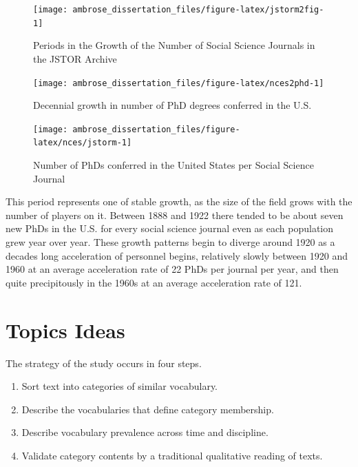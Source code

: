 \documentclass[]{book}
\providecommand{\tightlist}{%
  \setlength{\itemsep}{0pt}\setlength{\parskip}{0pt}}
\theoremstyle{definition}
\theoremstyle{definition}
\theoremstyle{definition}
\theoremstyle{remark}
\begin{document}
\begin{figure}

{\centering \texttt{[image: ambrose\_dissertation\_files/figure-latex/jstorm2fig-1]} 

}

\caption{Periods in the Growth of the Number of Social Science Journals in the JSTOR Archive}\label{fig:jstorm2fig}
\end{figure}

\begin{figure}

{\centering \texttt{[image: ambrose\_dissertation\_files/figure-latex/nces2phd-1]} 

}

\caption{Decennial growth in number of PhD degrees conferred in the U.S.}\label{fig:nces2phd}
\end{figure}

\begin{figure}

{\centering \texttt{[image: ambrose\_dissertation\_files/figure-latex/nces/jstorm-1]} 

}

\caption{Number of PhDs conferred in the United States per Social Science Journal}\label{fig:nces/jstorm}
\end{figure}

This period represents one of stable growth, as the size of the field
grows with the number of players on it. Between 1888 and 1922 there
tended to be about seven new PhDs in the U.S. for every social science
journal even as each population grew year over year. These growth
patterns begin to diverge around 1920 as a decades long acceleration of
personnel begins, relatively slowly between 1920 and 1960 at an average
acceleration rate of 22 PhDs per journal per year, and then quite
precipitously in the 1960s at an average acceleration rate of 121.

\hypertarget{topics-ideas}{%
\section{\texorpdfstring{Topics 
Ideas}{Topics  Ideas}}\label{topics-ideas}}

The strategy of the study occurs in four steps.

\begin{enumerate}
\def\labelenumi{\arabic{enumi}.}
\tightlist
\item
  Sort text into categories of similar vocabulary.
\item
  Describe the vocabularies that define category membership.
\item
  Describe vocabulary prevalence across time and discipline.
\item
  Validate category contents by a traditional qualitative reading of
  texts.
\end{enumerate}
\end{document}
